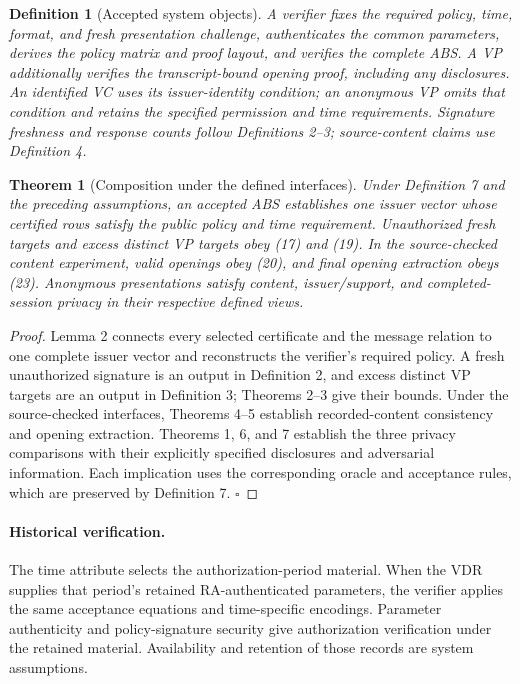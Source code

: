 \documentclass[11pt]{article}
\newtheorem{definition}{Definition}
\newtheorem{theorem}{Theorem}
\begin{document}
\begin{definition}[Accepted system objects]
A verifier fixes the required policy, time, format, and fresh presentation challenge, authenticates the common parameters, derives the policy matrix and proof layout, and verifies the complete ABS. A VP additionally verifies the transcript-bound opening proof, including any disclosures. An identified VC uses its issuer-identity condition; an anonymous VP omits that condition and retains the specified permission and time requirements. Signature freshness and response counts follow Definitions 2–3; source-content claims use Definition 4.

\end{definition}
\begin{theorem}[Composition under the defined interfaces]
Under Definition 7 and the preceding assumptions, an accepted ABS establishes one issuer vector whose certified rows satisfy the public policy and time requirement. Unauthorized fresh targets and excess distinct VP targets obey (17) and (19). In the source-checked content experiment, valid openings obey (20), and final opening extraction obeys (23). Anonymous presentations satisfy content, issuer/support, and completed-session privacy in their respective defined views.

\end{theorem}
\begin{proof}
Lemma 2 connects every selected certificate and the message relation to one complete issuer vector and reconstructs the verifier's required policy. A fresh unauthorized signature is an output in Definition 2, and excess distinct VP targets are an output in Definition 3; Theorems 2–3 give their bounds. Under the source-checked interfaces, Theorems 4–5 establish recorded-content consistency and opening extraction. Theorems 1, 6, and 7 establish the three privacy comparisons with their explicitly specified disclosures and adversarial information. Each implication uses the corresponding oracle and acceptance rules, which are preserved by Definition 7. \(\square\)

\end{proof}
\paragraph{Historical verification.}
The time attribute selects the authorization-period material. When the VDR supplies that period's retained RA-authenticated parameters, the verifier applies the same acceptance equations and time-specific encodings. Parameter authenticity and policy-signature security give authorization verification under the retained material. Availability and retention of those records are system assumptions.
\end{document}
